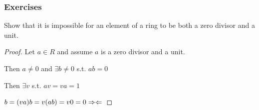 \newpage
\subsubsection{Exercises}
\begin{example}
    Show that it is impossible for an element of a ring to be both
    a zero divisor and a unit.
\end{example}
\begin{proof}
    Let $a\in R$ and assume $a$ is a zero divisor and a unit.

    Then $a \neq 0$ and $\exists b \neq 0$ s.t. $ab=0$

    Then $\exists v$ s.t. $av=va=1$

    $b=(va)b=v(ab)=v0=0 \Rightarrow \Leftarrow$
\end{proof}